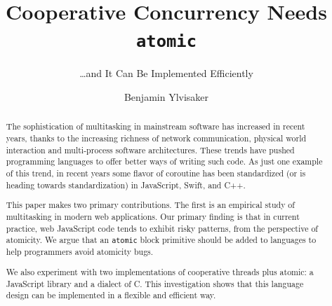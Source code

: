 \documentclass[acmsmall,anonymous,review]{acmart}\settopmatter{printfolios=true,printccs=false,printacmref=false}
\begin{document}
\newcommand{\charcoal}{DblBlind}
\newcommand{\atomic}{\texttt{atomic}}

\setlength{\pdfpageheight}{\paperheight}
\setlength{\pdfpagewidth}{\paperwidth}


\title{Cooperative Concurrency Needs \texttt{atomic}}
\subtitle{\ldots and It Can Be Implemented Efficiently}


\author{Benjamin Ylvisaker}


\begin{abstract}

The sophistication of multitasking in mainstream software has increased in recent years, thanks to the increasing richness of network communication, physical world interaction and multi-process software architectures.
These trends have pushed programming languages to offer better ways of writing such code.
As just one example of this trend, in recent years some flavor of coroutine has been standardized (or is heading towards standardization) in JavaScript, Swift, and C++.

This paper makes two primary contributions.
The first is an empirical study of multitasking in modern web applications.
Our primary finding is that in current practice, web JavaScript code tends to exhibit risky patterns, from the perspective of atomicity.
We argue that an \texttt{atomic} block primitive should be added to languages to help programmers avoid atomicity bugs.

We also experiment with two implementations of cooperative threads plus atomic: a JavaScript library and a dialect of C.
This investigation shows that this language design can be implemented in a flexible and efficient way.

\end{abstract}
\end{document}
